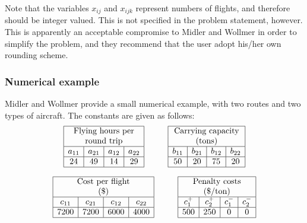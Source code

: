 Note that the variables $x_{ij}$ and $x_{ijk}$ represent numbers of flights, and therefore should be integer valued.  This is not specified in the problem statement, however.  This is apparently an acceptable compromise to Midler and Wollmer \cite{midler69} in order to simplify the problem, and they recommend that the user	adopt his/her own rounding scheme.

\subsubsection{Numerical example}
Midler and Wollmer \cite{midler69} provide a small numerical example, with two routes and two types of aircraft.  The constants are given as follows:
\[
\begin{array}{|c|c|c|c|}
\hline
\multicolumn{4}{|c|}{\mbox{Flying hours per}}\\
\multicolumn{4}{|c|}{\mbox{round trip}}\\
\hline
a_{11}	& a_{21} & a_{12} & a_{22}\\
\hline
24 &  49 & 14 & 29\\
\hline
\end{array}
\hspace{1cm}
\begin{array}{|c|c|c|c|}
\hline
\multicolumn{4}{|c|}{\mbox{Carrying capacity}}\\
\multicolumn{4}{|c|}{\mbox{(tons)}}\\
\hline
b_{11}	& b_{21} & b_{12} & b_{22}\\
\hline
50 & 20 & 75 & 20\\
\hline
\end{array}
\]

\[
\begin{array}{|c|c|c|c|}
\hline
\multicolumn{4}{|c|}{\mbox{Cost per flight}}\\
\multicolumn{4}{|c|}{\mbox{(\$)}}\\%
\hline
c_{11}	& c_{21} & c_{12} & c_{22}\\
\hline
7200 & 7200 & 6000 & 4000\\
\hline
\end{array}
\hspace{1cm}
\begin{array}{|c|c|c|c|}
\hline
\multicolumn{4}{|c|}{\mbox{Penalty costs}}\\
\multicolumn{4}{|c|}{\mbox{(\$/ton)}}\\%
\hline
c_1^+ & c_2^+ & c_1^- & c_2^-\\
\hline
500 & 250 & 0 & 0\\
\hline
\end{array}
\]

